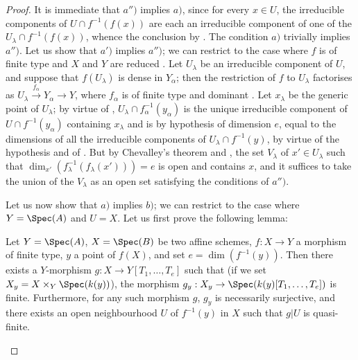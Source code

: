 \begin{proof}
It is immediate that $a'')$ implies $a)$, since for every $x\in U$, the irreducible components of $U\cap f^{-1}(f(x))$ are each an irreducible component of one of the $U_\lambda\cap f^{-1}(f(x))$, whence the conclusion by .
The condition $a)$ trivially implies $a'')$.
Let us show that $a')$ implies $a'')$; we can restrict to the case where $f$ is of finite type and $X$ and $Y$ are reduced .
Let $U_\lambda$ be an irreducible component of $U$, and suppose that $f(U_\lambda)$ is dense in $Y_\alpha$; then the restriction of $f$ to $U_\lambda$ factorises as $U_\lambda\xrightarrow{f_\alpha}Y_\alpha\longrightarrow Y$, where $f_\alpha$ is of finite type and dominant .
Let $x_\lambda$ be the generic point of $U_\lambda$; by virtue of , $U_\lambda\cap f_\alpha^{-1}(y_\alpha)$ is the unique irreducible component of $U\cap f^{-1}(y_\alpha)$ containing $x_\lambda$ and is by hypothesis of dimension $e$, equal to the dimensions of all the irreducible components of $U_\lambda\cap f^{-1}(y)$, by virtue of the hypothesis and of .
But by Chevalley's theorem  and , the set $V_\lambda$ of $x'\in U_\lambda$ such that $\dim_{x'}(f_\lambda^{-1}(f_\lambda(x')))=e$ is open and contains $x$, and it suffices to take the union of the $V_\lambda$ as an open set satisfying the conditions of $a'')$.

Let us now show that $a)$ implies $b)$; we can restrict to the case where $Y=\Spec(A)$ and $U=X$.
Let us first prove the following lemma:

\begin{lemma}[13.3.1.1]
\label{IV.13.3.1.1}
Let $Y=\Spec(A)$, $X=\Spec(B)$ be two affine schemes, $f:X\to Y$ a morphism of finite type, $y$ a point of $f(X)$, and set $e=\dim(f^{-1}(y))$.
Then there exists a $Y$-morphism $g:X\to Y[T_1,\ldots,T_e]$ such that (if we set $X_y=X\times_Y\Spec(k(y))$), the morphism $g_y:X_y\to\Spec(k(y)[T_1,\ldots,T_e])$ is finite.
Furthermore, for any such morphism $g$, $g_y$ is necessarily surjective, and there exists an open neighbourhood $U$ of $f^{-1}(y)$ in $X$ such that $g|U$ is quasi-finite.
\end{lemma}


\end{proof}
